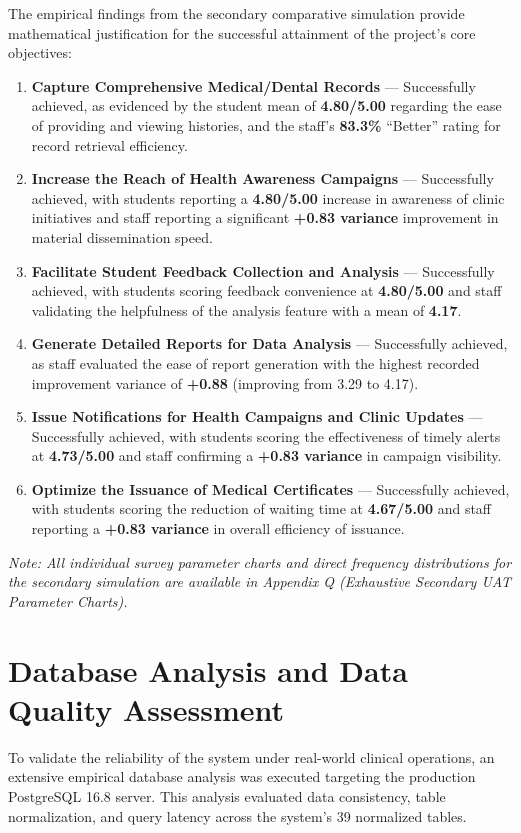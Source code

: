 The empirical findings from the secondary comparative simulation provide mathematical justification for the successful attainment of the project's core objectives:

\begin{enumerate}
    \item \textbf{Capture Comprehensive Medical/Dental Records} --- Successfully achieved, as evidenced by the student mean of \textbf{4.80/5.00} regarding the ease of providing and viewing histories, and the staff's \textbf{83.3\%} ``Better'' rating for record retrieval efficiency.
    \item \textbf{Increase the Reach of Health Awareness Campaigns} --- Successfully achieved, with students reporting a \textbf{4.80/5.00} increase in awareness of clinic initiatives and staff reporting a significant \textbf{+0.83 variance} improvement in material dissemination speed.
    \item \textbf{Facilitate Student Feedback Collection and Analysis} --- Successfully achieved, with students scoring feedback convenience at \textbf{4.80/5.00} and staff validating the helpfulness of the analysis feature with a mean of \textbf{4.17}.
    \item \textbf{Generate Detailed Reports for Data Analysis} --- Successfully achieved, as staff evaluated the ease of report generation with the highest recorded improvement variance of \textbf{+0.88} (improving from 3.29 to 4.17).
    \item \textbf{Issue Notifications for Health Campaigns and Clinic Updates} --- Successfully achieved, with students scoring the effectiveness of timely alerts at \textbf{4.73/5.00} and staff confirming a \textbf{+0.83 variance} in campaign visibility.
    \item \textbf{Optimize the Issuance of Medical Certificates} --- Successfully achieved, with students scoring the reduction of waiting time at \textbf{4.67/5.00} and staff reporting a \textbf{+0.83 variance} in overall efficiency of issuance.
\end{enumerate}

\textit{Note: All individual survey parameter charts and direct frequency distributions for the secondary simulation are available in Appendix Q (Exhaustive Secondary UAT Parameter Charts).}

\section{Database Analysis and Data Quality Assessment}
To validate the reliability of the system under real-world clinical operations, an extensive empirical database analysis was executed targeting the production PostgreSQL 16.8 server. This analysis evaluated data consistency, table normalization, and query latency across the system's 39 normalized tables.

